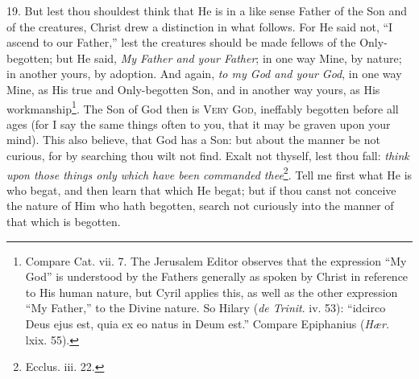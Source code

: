 19. But lest thou shouldest think that He is in a like sense Father of the Son and of the creatures, Christ drew a distinction in what follows. For He said not, “I ascend to our Father,” lest the creatures should be made fellows of the Only-begotten; but He said, \emph{My Father and your Father}; in one way Mine, by nature; in another yours, by adoption. And again, \emph{to my God and your God}, in one way Mine, as His true and Only-begotten Son, and in another way yours, as His workmanship\footnote{Compare Cat. vii. 7. The Jerusalem Editor observes that the expression “My God” is understood by the Fathers generally as spoken by Christ in reference to His human nature, but Cyril applies this, as well as the other expression “My Father,” to the Divine nature. So Hilary (\emph{de Trinit}. iv. 53): “idcirco Deus ejus est, quia ex eo natus in Deum est.” Compare Epiphanius (\emph{Hær.} lxix. 55).}. The Son of God then is \textsc{Very God}, ineffably begotten before all ages (for I say the same things often to you, that it may be graven upon your mind). This also believe, that God has a Son: but about the manner be not curious, for by searching thou wilt not find. Exalt not thyself, lest thou fall: \emph{think upon those things only which have been commanded thee}\footnote{Ecclus. iii. 22.}. Tell me first what He is who begat, and then learn that which He begat; but if thou canst not conceive the nature of Him who hath begotten, search not curiously into the manner of that which is begotten.

